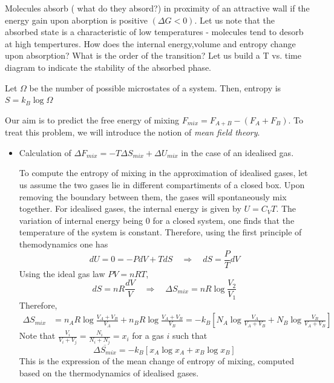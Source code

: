 \documentclass[../phys-f308.tex]{subfiles}
\begin{document}
    Molecules absorb (\color{red} what do they absord?\color{black}) in proximity of an attractive wall if the energy gain upon aborption is positive $(\Delta G < 0)$. Let us note that the absorbed state is a characteristic of low temperatures - molecules tend to desorb at high tempertures. How does the internal energy,volume and entropy change upon absorption? What is the order of the transition? Let us build a T vs. time diagram to indicate the stability of the absorbed phase. 

    \begin{definition}\label{def: Boltzmann definition}
        Let $\Omega$ be the number of possible microstates of a system. Then, entropy is $S = k_B\log\Omega$
    \end{definition}

    \begin{example}\label{ex: mixing of two liquids}
        Our aim is to predict the free energy of mixing $F_{mix} = F_{A+B} - (F_A+F_B)$. To treat this problem, we will introduce the notion of \emph{mean field theory}.
        \begin{itemize}
            \item Calculation of $\Delta F_{mix} = -T\Delta S_{mix} + \Delta U_{mix}$ in the case of an idealised gas.
        
        To compute the entropy of mixing in the approximation of idealised gases, let us assume the two gases lie in different compartiments of a closed box. Upon removing the boundary between them, the gases will spontaneously mix together. For idealised gases, the internal energy is given by $U = C_VT$.  The variation of internal energy being $0$ for a closed system, one finds that the temperature of the system is constant. Therefore, using the first principle of themodynamics one has
        \begin{equation}
            dU = 0 = -PdV + TdS \quad \Rightarrow \quad dS = \frac{P}{T}dV
        \end{equation}
        Using the ideal gas law $PV = nRT$,
        \begin{equation}
            dS = nR\frac{dV}{V} \quad \Rightarrow \quad \Delta S_{mix} = nR\log\frac{V_2}{V_1}
        \end{equation}
        Therefore, 
        \begin{align}
            \Delta S_{mix} &= n_AR\log\frac{V_A+V_B}{V_A}+n_BR\log\frac{V_A+V_B}{V_B} = -k_B\left[N_A\log\frac{V_A}{V_A+V_B}+N_B\log\frac{V_B}{V_A+V_B}\right]
        \end{align}
        Note that $\frac{V_i}{V_i+V_j} = \frac{N_i}{N_i+N_j} = x_i$ for a gas $i$ such that
        \begin{equation}
            \overline{\Delta S_{mix}} = -k_B\left[x_A\log x_A+x_B\log x_B\right]\label{eq: mean change of entropy of mixing}
        \end{equation}
        This is the expression of the mean change of entropy of mixing, computed based on the thermodynamics of idealised gases.\\
        

\end{itemize}
\end{example}
\end{document}

